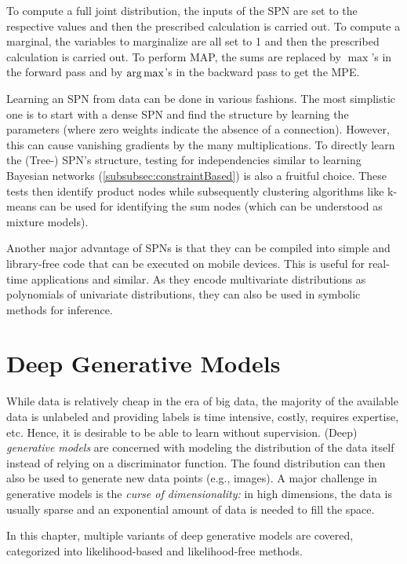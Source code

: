 		To compute a full joint distribution, the inputs of the SPN are set to the respective values and then the prescribed calculation is carried out. To compute a marginal, the variables to marginalize are all set to \num{1} and then the prescribed calculation is carried out. To perform MAP, the sums are replaced by \(\max\)'s in the forward pass and by \(\operatorname*{arg\,max}\)'s in the backward pass to get the MPE.

		Learning an SPN from data can be done in various fashions. The most simplistic one is to start with a dense SPN and find the structure by learning the parameters (where zero weights indicate the absence of a connection). However, this can cause vanishing gradients by the many multiplications. To directly learn the (Tree-) SPN's structure, testing for independencies similar to learning Bayesian networks (\autoref{subsubsec:constraintBased}) is also a fruitful choice. These tests then identify product nodes while subsequently clustering algorithms like k-means can be used for identifying the sum nodes (which can be understood as mixture models).

		Another major advantage of SPNs is that they can be compiled into simple and library-free code that can be executed on mobile devices. This is useful for real-time applications and similar. As they encode multivariate distributions as polynomials of univariate distributions, they can also be used in symbolic methods for inference.

\chapter{Deep Generative Models}
	While data is relatively cheap in the era of big data, the majority of the available data is unlabeled and providing labels is time intensive, costly, requires expertise, etc. Hence, it is desirable to be able to learn without supervision. (Deep) \emph{generative models} are concerned with modeling the distribution of the data itself instead of relying on a discriminator function. The found distribution can then also be used to generate new data points (e.g., images). A major challenge in generative models is the \emph{curse of dimensionality:} in high dimensions, the data is usually sparse and an exponential amount of data is needed to fill the space.

	In this chapter, multiple variants of deep generative models are covered, categorized into likelihood-based and likelihood-free methods.

